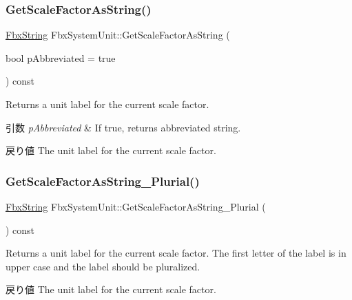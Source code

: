 \subsubsection{\texorpdfstring{Get\+Scale\+Factor\+As\+String()}{GetScaleFactorAsString()}}
{\footnotesize\ttfamily \hyperlink{class_fbx_string}{Fbx\+String} Fbx\+System\+Unit\+::\+Get\+Scale\+Factor\+As\+String (\begin{DoxyParamCaption}\item[{bool}]{p\+Abbreviated = {\ttfamily true} }\end{DoxyParamCaption}) const}

Returns a unit label for the current scale factor. 
\begin{DoxyParams}{引数}
{\em p\+Abbreviated} & If {\ttfamily true}, returns abbreviated string. \\
\hline
\end{DoxyParams}
\begin{DoxyReturn}{戻り値}
The unit label for the current scale factor. 
\end{DoxyReturn}
\mbox{\label{class_fbx_system_unit_aa9a883aeffb6e9814b3ecc6157606954}} 
\subsubsection{\texorpdfstring{Get\+Scale\+Factor\+As\+String\+\_\+\+Plurial()}{GetScaleFactorAsString\_Plurial()}}
{\footnotesize\ttfamily \hyperlink{class_fbx_string}{Fbx\+String} Fbx\+System\+Unit\+::\+Get\+Scale\+Factor\+As\+String\+\_\+\+Plurial (\begin{DoxyParamCaption}{ }\end{DoxyParamCaption}) const}

Returns a unit label for the current scale factor. The first letter of the label is in upper case and the label should be pluralized. \begin{DoxyReturn}{戻り値}
The unit label for the current scale factor. 
\end{DoxyReturn}
\mbox{\label{class_fbx_system_unit_a4a338e68ec0e74358850cca54ea5a5f6}} 
